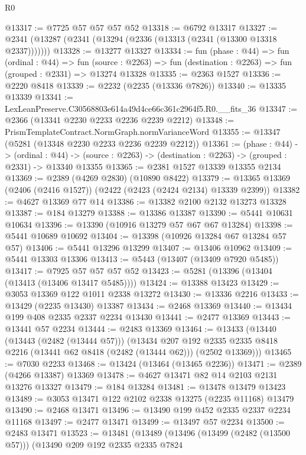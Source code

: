 \begin{lexlean}{R0}
\begin{coremodule}
@13317 := @7725 @57 @57 @57 @52
@13318 := @6792 @13317
@13327 := @2341 (@13287 (@2341 (@13294 (@2336 (@13313 (@2341 (@13300 @13318 @2337)))))))
@13328 := @13277 @13327
@13334 := fun (phase : @44) =>
  fun (ordinal : @44) =>
  fun (source : @2263) => fun (destination : @2263) => fun (grouped : @2331) => @13274 @13328
@13335 := @2363 @1527
@13336 := @2220 @8418
@13339 := @2232 (@2235 (@13336 @7826))
@13340 := @13335 @13339
@13341 := LexLeanPreserve.C30568803e614a49d4ce66c361c2964f5.R0.__fits_36
@13347 := @2366 (@13341 @2230 @2233 @2236 @2239 @2212)
@13348 := PrismTemplateContract.NormGraph.normVarianceWord
@13355 := @13347 (@5281 (@13348 @2230 @2233 @2236 @2239 @2212))
@13361 := (phase : @44) ->
  (ordinal : @44) -> (source : @2263) -> (destination : @2263) -> (grouped : @2331) -> @13340 @13355
@13365 := @2381 @1527 @13339 @13355 @2134
@13369 := @2389 (@4269 @2830) (@10890 @8422)
@13379 := @13365 @13369 (@2406 (@2416 @1527)) (@2422 (@2423 (@2424 @2134) @13339 @2399))
@13382 := @4627 @13369 @77 @14
@13386 := @13382 @2100 @2132 @13273 @13328
@13387 := @184 @13279
@13388 := @13386 @13387
@13390 := @5441 @10631 @10634
@13396 := @13390 (@10916 @13279 @57 @67 @67 @13284)
@13398 := @5441 @10689 @10692
@13404 := @13398 (@10926 @13284 @67 @13284 @57 @57)
@13406 := @5441 @13296 @13299
@13407 := @13406 @10962
@13409 := @5441 @13303 @13306
@13413 := @5443 (@13407 (@13409 @7920 @5485))
@13417 := @7925 @57 @57 @57 @52
@13423 := @5281 (@13396 (@13404 (@13413 (@13406 @13417 @5485))))
@13424 := @13388 @13423
@13429 := @3053 @13369 @122 @1011 @2338 @13272
@13430 := @13336 @2216
@13433 := @13429 (@2235 @13430) @13387
@13434 := @2468 @13369
@13440 := @13434 @199 @408 @2335 @2337 @2234 @13430
@13441 := @2477 @13369
@13443 := @13441 @57 @2234
@13444 := @2483 @13369
@13464 := @13433
    (@13440
      (@13443 (@2482 (@13444 @57)))
      (@13434
        @207
        @192
        @2335
        @2335
        @8418
        @2216
        (@13441 @62 @8418 (@2482 (@13444 @62)))
        (@2502 @13369)))
@13465 := @7030 @2233
@13468 := @13424 (@13464 (@13465 @2236))
@13471 := @2389 (@4266 @13387) @13369
@13478 := @4627 @13471 @82 @14 @2103 @2131 @13276 @13327
@13479 := @184 @13284
@13481 := @13478 @13479 @13423
@13489 := @3053 @13471 @122 @2102 @2338 @13275 (@2235 @11168) @13479
@13490 := @2468 @13471
@13496 := @13490 @199 @452 @2335 @2337 @2234 @11168
@13497 := @2477 @13471
@13499 := @13497 @57 @2234
@13500 := @2483 @13471
@13523 := @13481
    (@13489
      (@13496
        (@13499 (@2482 (@13500 @57)))
        (@13490
          @209
          @192
          @2335
          @2335
          @7824

\end{coremodule}
\end{lexlean}

